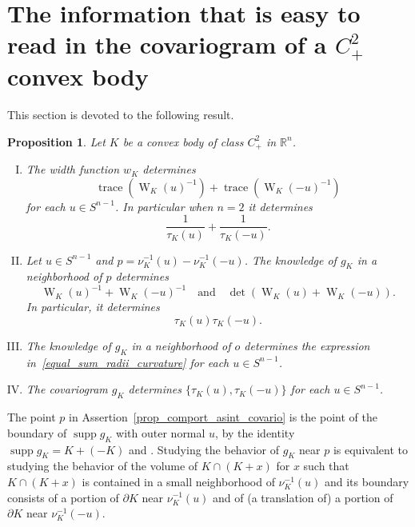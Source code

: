 \documentclass[a4paper]{amsart}
\newtheorem{proposition}[theorem]{Proposition}
\theoremstyle{definition}
\numberwithin{equation}{section}
\begin{document}
\section{The information that is easy to read in the covariogram of a $C^2_+$ convex body} \label{sec_c2plus}
This section is devoted to the following result.
\begin{proposition}\label{teo_information_c2+_bodies}
Let $K$ be a convex body of class $C^2_+$ in ${\mathbb{R}}^n$.
\begin{enumerate}[(I)]
\item\label{prop_sum_reverse_weingarten} 
The width function ${{{w}}}_K$ determines 
\begin{equation*}
{{\operatorname{trace}}}\left({{\mathop{W}}}_K(u)^{-1}\right)+{{\operatorname{trace}}}\left({{\mathop{W}}}_K(-u)^{-1}\right)
\end{equation*}
for each $u\in {S^{n-1}}$. In particular when $n=2$ it determines 
\begin{equation}\label{equal_sum_radii_curvature}
\frac1{{\tau}_K(u)}+\frac1{{\tau}_K(-u)}.
\end{equation}
\item\label{prop_comport_asint_covario} 
Let $u\in{S^{n-1}}$ and $p=\nu^{-1}_K(u)-\nu^{-1}_K(-u)$. The knowledge of $g_K$ in a neighborhood of $p$ determines
\[
{{\mathop{W}}}_K(u)^{-1}+{{\mathop{W}}}_K(-u)^{-1}\quad\text{and}\quad \det\left({{\mathop{W}}}_K(u)+{{\mathop{W}}}_K(-u)\right).
\]
In particular, it determines
\begin{equation}\label{product_gauss_curv}
 {\tau}_K(u){\tau}_K(-u).
\end{equation}
\item\label{prop_sum_radii_curvature}
The knowledge of $g_K$ in a neighborhood of $o$ determines the expression in~\eqref{equal_sum_radii_curvature} for each $u\in{S^{n-1}}$.
\item\label{nonordered_curvatures}
The covariogram $g_K$ determines $\{{\tau}_K(u),{\tau}_K(-u)\}$ for each $u\in{S^{n-1}}$.
\end{enumerate}
\end{proposition}

The point $p$ in Assertion~\eqref{prop_comport_asint_covario} is the point of the boundary of ${{\operatorname{supp}}} g_K$ with outer normal $u$, by the identity ${{\operatorname{supp}}} g_K=K+(-K)$ and  \cite[Th. 1.7.5(c)]{Sc}. Studying the  behavior of $g_K$ near $p$ is equivalent to studying the behavior of the volume of $K\cap(K+x)$ for $x$ such that $K\cap(K+x)$ is contained in a small neighborhood of $\nu^{-1}_K(u)$ and its boundary consists of a portion of  ${{\partial}} K$ near $\nu^{-1}_K(u)$ and of (a translation of) a portion of ${{\partial}} K$ near $\nu^{-1}_K(-u)$.
\end{document}
